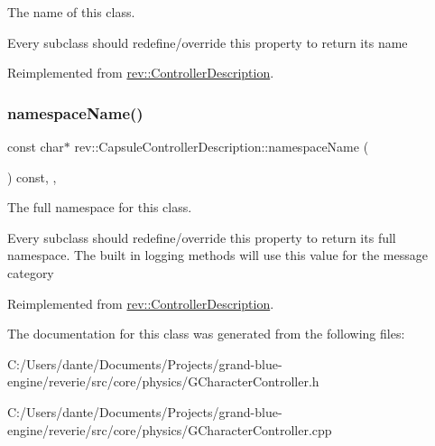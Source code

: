 The name of this class. 

Every subclass should redefine/override this property to return its name 

Reimplemented from \mbox{\hyperlink{classrev_1_1_controller_description_a8170f2acabf587228bae29aba6c1a90b}{rev\+::\+Controller\+Description}}.

\mbox{\label{classrev_1_1_capsule_controller_description_adb2e0dbf5b569df3b0536b888b0af21c}} 
\subsubsection{\texorpdfstring{namespaceName()}{namespaceName()}}
{\footnotesize\ttfamily const char$\ast$ rev\+::\+Capsule\+Controller\+Description\+::namespace\+Name (\begin{DoxyParamCaption}{ }\end{DoxyParamCaption}) const\hspace{0.3cm}{\ttfamily [inline]}, {\ttfamily [override]}, {\ttfamily [virtual]}}



The full namespace for this class. 

Every subclass should redefine/override this property to return its full namespace. The built in logging methods will use this value for the message category 

Reimplemented from \mbox{\hyperlink{classrev_1_1_controller_description_a95ae000783dd5460060582a129c9251d}{rev\+::\+Controller\+Description}}.



The documentation for this class was generated from the following files\+:\begin{DoxyCompactItemize}
\item 
C\+:/\+Users/dante/\+Documents/\+Projects/grand-\/blue-\/engine/reverie/src/core/physics/G\+Character\+Controller.\+h\item 
C\+:/\+Users/dante/\+Documents/\+Projects/grand-\/blue-\/engine/reverie/src/core/physics/G\+Character\+Controller.\+cpp\end{DoxyCompactItemize}
